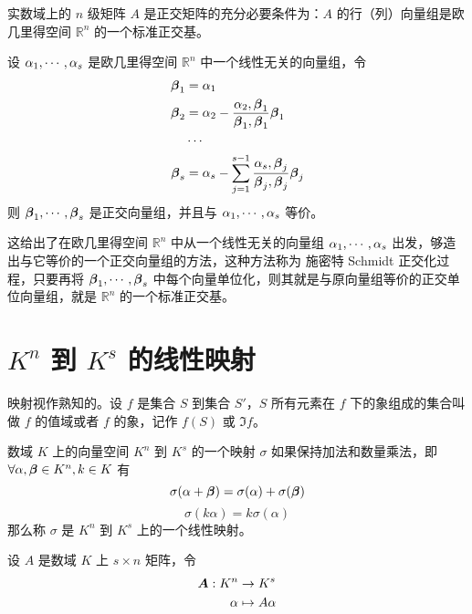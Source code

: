 \begin{theorem}
	实数域上的 $n$ 级矩阵 $A$ 是正交矩阵的充分必要条件为：$A$ 的行（列）向量组是欧几里得空间 $\mathbb{R}^n$ 的一个标准正交基。
\end{theorem}

\begin{theorem}
	设 $\alpha_1,\cdots,\alpha_s$ 是欧几里得空间 $\mathbb{R}^n$ 中一个线性无关的向量组，令
	\[
		\begin{aligned}
			\boldsymbol{\beta}_1 & =\alpha_1                                                                                           \\
			\boldsymbol{\beta}_2 & =\alpha_2 - \frac{\alpha_2,\boldsymbol{\beta}_1}{\boldsymbol{\beta}_1,\boldsymbol{\beta}_1}\boldsymbol{\beta}_1                 \\
			              & \cdots                                                                                              \\
			\boldsymbol{\beta}_s & = \alpha_s-\sum_{j=1}^{s-1}\frac{\alpha_s,\boldsymbol{\beta}_j}{\boldsymbol{\beta}_j,\boldsymbol{\beta}_j}\boldsymbol{\beta}_j
		\end{aligned}
	\]
	则 $\boldsymbol{\beta}_1,\cdots,\boldsymbol{\beta}_s$ 是正交向量组，并且与 $\alpha_1,\cdots,\alpha_s$ 等价。
\end{theorem}

这给出了在欧几里得空间 $\mathbb{R}^n$ 中从一个线性无关的向量组 $\alpha_1,\cdots,\alpha_s$ 出发，够造出与它等价的一个正交向量组的方法，这种方法称为 施密特 Schmidt 正交化过程，只要再将 $\boldsymbol{\beta}_1,\cdots,\boldsymbol{\beta}_s$ 中每个向量单位化，则其就是与原向量组等价的正交单位向量组，就是 $\mathbb{R}^n$ 的一个标准正交基。

\section{\texorpdfstring{$K^n$ 到 $K^s$ 的线性映射}{Kn 到 Ks 的线性映射}}

映射视作熟知的。设 $f$ 是集合 $S$ 到集合 $S'$，$S$ 所有元素在 $f$ 下的象组成的集合叫做 $f$ 的值域或者 $f$ 的象，记作 $f(S)$ 或 $\Im f$。

\begin{definition}
	数域 $K$ 上的向量空间 $K^n$ 到 $K^s$ 的一个映射 $\sigma$ 如果保持加法和数量乘法，即 $\forall \alpha,\boldsymbol{\beta} \in K^n,k\in K$ 有
	\[\sigma (\alpha+\boldsymbol{\beta}) = \sigma(\alpha) + \sigma(\boldsymbol{\beta})\]
	\[\sigma(k\alpha) = k\sigma(\alpha)\]
	那么称 $\sigma$ 是 $K^n$ 到 $K^s$ 上的一个线性映射。
\end{definition}

设 $A$ 是数域 $K$ 上 $s \times n$ 矩阵，令
\[
	\begin{aligned}
		\boldsymbol{A} : K^n & \rightarrow K^s  \\
		\alpha        & \mapsto A\alpha
	\end{aligned}
\]


